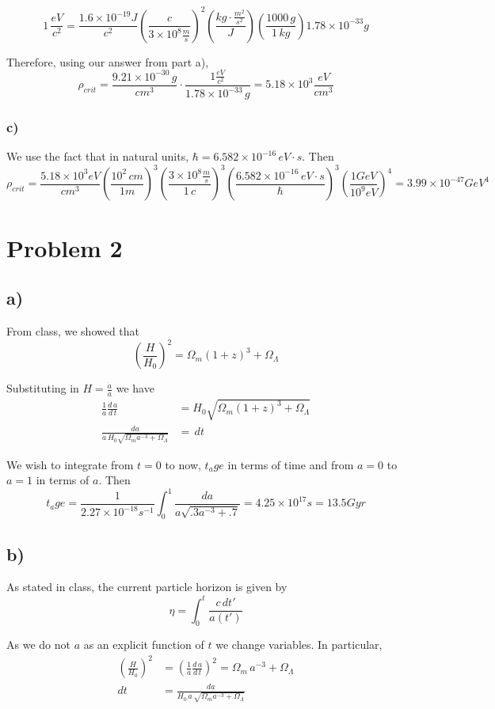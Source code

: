 \documentclass{article}
\newcommand{\tot}[2]{\frac{d\,#1}{d\,#2}}
\begin{document}
\[1\,\frac{eV}{c^2} = \frac{1.6\times 10^{-19} J}{c^2}\left(\frac{c}{3\times 10^8 \frac{m}{s}}\right)^2\left(\frac{kg\cdot \frac{m^2}{s^2}}{J}\right)\left(\frac{1000\,g}{1\,kg}\right) 1.78\times 10^{-33}g\]

Therefore, using our answer from part a),
\[\rho_{crit} = \frac{9.21\times 10^{-30}\,g}{cm^3}\cdot\frac{1\frac{eV}{c^2}}{1.78\times 10^{-33}\,g}=5.18\times 10^3 \frac{eV}{cm^3}\]

\subsubsection*{c)}
We use the fact that in natural units, $\hbar = 6.582\times 10^{-16}\,eV\cdot s$. Then
\[\rho_{crit} = \frac{5.18\times 10^3 eV}{cm^3}\left(\frac{10^2\,cm}{1m}\right)^3\left(\frac{3\times 10^8 \frac{m}{s}}{1\,c}\right)^3\left(\frac{6.582\times 10^{-16}\,eV\cdot s}{\hbar}\right)^3\left(\frac{1 GeV}{10^9 eV}\right)^4 = 3.99\times 10^{-47}GeV^4\]

\section*{Problem 2}
\subsection*{a)}
From class, we showed that
\[\left(\frac{H}{H_0}\right)^2 =\Omega_m (1+z)^3+\Omega_{\Lambda}\]

Substituting in $H = \frac{\dot{a}}{a}$ we have
\begin{align*}
\frac{1}{a}\tot{a}{t} &= H_0\sqrt{\Omega_m(1+z)^3+\Omega_{\Lambda}}\\
\frac{da}{a\,H_0\sqrt{\Omega_m a^{-3}+\Omega_{\Lambda}}} &=\,dt
\end{align*}

We wish to integrate from $t=0$ to now, $t_age$ in terms of time and from $a=0$ to $a=1$ in terms of $a$. Then
\[t_age = \frac{1}{2.27\times 10^{-18} s^{-1}}\int_0^1 \frac{da}{a\sqrt{.3 a^{-3} + .7}}=4.25\times 10^{17}s=13.5Gyr\]
\subsection*{b)}
As stated in class, the current particle horizon is given by 
\[\eta = \int_0^t \frac{c\,dt'}{a(t')}\]

As we do not $a$ as an explicit function of $t$ we change variables. In particular,
\begin{align*}
\left(\frac{H}{H_0}\right)^2 &= \left(\frac{1}{a}\tot{a}{t}\right)^2 = \Omega_m\,a^{-3} + \Omega_\Lambda\\
dt &= \frac{da}{H_0\,a\,\sqrt{\Omega_ma^{-3}+\Omega_{\Lambda}}}
\end{align*}
\end{document}
